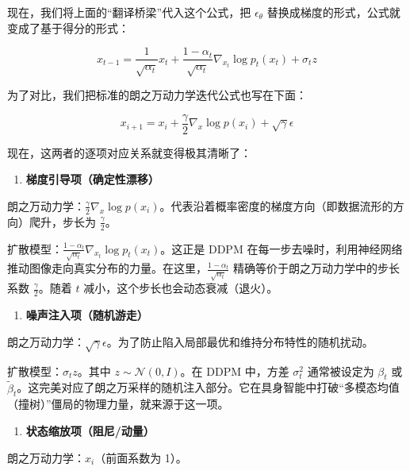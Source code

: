 现在，我们将上面的``翻译桥梁''代入这个公式，把 \(\epsilon_\theta\) 替换成梯度的形式，公式就变成了基于得分的形式：

\[
x_{t-1}=\frac{1}{\sqrt{\alpha_t}}x_t
+\frac{1-\alpha_t}{\sqrt{\alpha_t}}\nabla_{x_t}\log p_t(x_t)
+\sigma_t z
\]

为了对比，我们把标准的朗之万动力学迭代公式也写在下面：

\[
x_{i+1}=x_i+\frac{\gamma}{2}\nabla_x\log p(x_i)+\sqrt{\gamma}\epsilon
\]

现在，这两者的逐项对应关系就变得极其清晰了：

\begin{enumerate}
\def\labelenumi{\arabic{enumi}.}
\tightlist
\item
  \textbf{梯度引导项（确定性漂移）}
\end{enumerate}

朗之万动力学：\(\frac{\gamma}{2}\nabla_x\log p(x_i)\)。代表沿着概率密度的梯度方向（即数据流形的方向）爬升，步长为 \(\frac{\gamma}{2}\)。

扩散模型：\(\frac{1-\alpha_t}{\sqrt{\alpha_t}}\nabla_{x_t}\log p_t(x_t)\)。这正是 DDPM 在每一步去噪时，利用神经网络推动图像走向真实分布的力量。在这里，\(\frac{1-\alpha_t}{\sqrt{\alpha_t}}\) 精确等价于朗之万动力学中的步长系数 \(\frac{\gamma}{2}\)。随着 \(t\) 减小，这个步长也会动态衰减（退火）。

\begin{enumerate}
\def\labelenumi{\arabic{enumi}.}
\setcounter{enumi}{1}
\tightlist
\item
  \textbf{噪声注入项（随机游走）}
\end{enumerate}

朗之万动力学：\(\sqrt{\gamma}\epsilon\)。为了防止陷入局部最优和维持分布特性的随机扰动。

扩散模型：\(\sigma_t z\)。其中 \(z\sim\mathcal{N}(0,I)\)。在 DDPM 中，方差 \(\sigma_t^2\) 通常被设定为 \(\beta_t\) 或 \(\tilde{\beta}_t\)。这完美对应了朗之万采样的随机注入部分。它在具身智能中打破``多模态均值（撞树）''僵局的物理力量，就来源于这一项。

\begin{enumerate}
\def\labelenumi{\arabic{enumi}.}
\setcounter{enumi}{2}
\tightlist
\item
  \textbf{状态缩放项（阻尼/动量）}
\end{enumerate}

朗之万动力学：\(x_i\)（前面系数为 1）。

